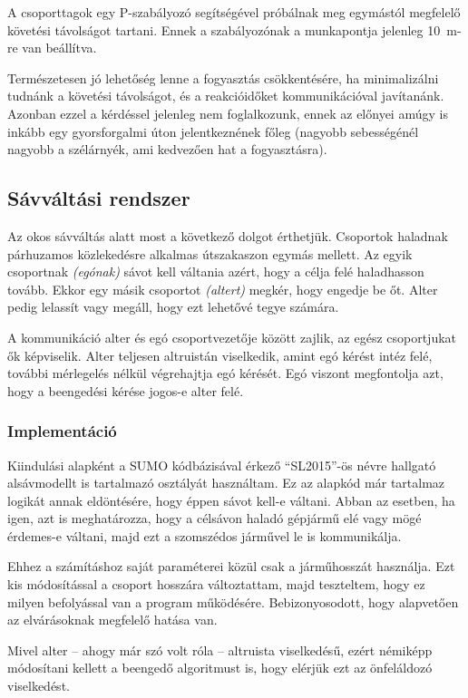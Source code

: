 \documentclass{article}
\begin{document}
			A csoporttagok egy P-szabályozó segítségével próbálnak meg egymástól megfelelő követési távolságot tartani. Ennek a szabályozónak a munkapontja jelenleg 10~m-re van beállítva.
			
			Természetesen jó lehetőség lenne a fogyasztás csökkentésére, ha minimalizálni tudnánk a követési távolságot, és a reakcióidőket kommunikációval javítanánk. Azonban ezzel a kérdéssel jelenleg nem foglalkozunk, ennek az előnyei amúgy is inkább egy gyorsforgalmi úton jelentkeznének főleg (nagyobb sebességénél nagyobb a szélárnyék, ami kedvezően hat a fogyasztásra).
			
	\subsection{Sávváltási rendszer}
		Az okos sávváltás alatt most a következő dolgot érthetjük. Csoportok haladnak párhuzamos közlekedésre alkalmas útszakaszon egymás mellett. Az egyik csoportnak \textit{(egónak)} sávot kell váltania azért, hogy a célja felé haladhasson tovább. Ekkor egy másik csoportot \textit{(altert)} megkér, hogy engedje be őt. Alter pedig lelassít vagy megáll, hogy ezt lehetővé tegye számára.
		
		A kommunikáció alter és egó csoportvezetője között zajlik, az egész csoportjukat ők képviselik. Alter teljesen altruistán viselkedik, amint egó kérést intéz felé, további mérlegelés nélkül végrehajtja egó kérését. Egó viszont megfontolja azt, hogy a beengedési kérése jogos-e alter felé.
		
		\subsubsection{Implementáció}
			Kiindulási alapként a SUMO kódbázisával érkező ``SL2015''-ös névre hallgató alsávmodellt is tartalmazó osztályát használtam. Ez az alapkód már tartalmaz logikát annak eldöntésére, hogy éppen sávot kell-e váltani. Abban az esetben, ha igen, azt is meghatározza, hogy a célsávon haladó gépjármű elé vagy mögé érdemes-e váltani, majd ezt a szomszédos járművel le is kommunikálja.
			
			Ehhez a számításhoz saját paraméterei közül csak a járműhosszát használja. Ezt kis módosítással a csoport hosszára változtattam, majd teszteltem, hogy ez milyen befolyással van a program működésére. Bebizonyosodott, hogy alapvetően az elvárásoknak megfelelő hatása van.
			
			Mivel alter -- ahogy már szó volt róla -- altruista viselkedésű, ezért némiképp módosítani kellett a beengedő algoritmust is, hogy elérjük ezt az önfeláldozó viselkedést.
			
\end{document}
